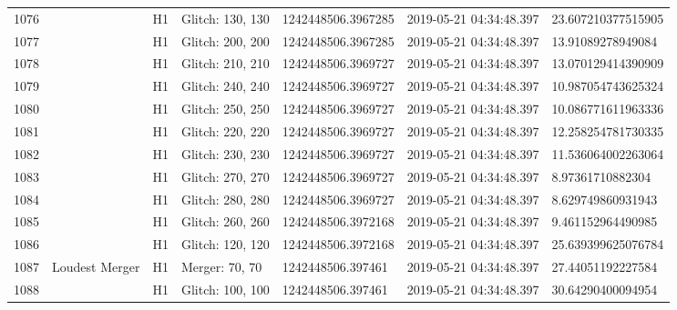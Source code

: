 \begin{longtable}{lllllll}
1076 &                                                    &       H1 &  Glitch: 130, 130 &  1242448506.3967285 &  2019-05-21 04:34:48.397 &  23.607210377515905 \\
1077 &                                                    &       H1 &  Glitch: 200, 200 &  1242448506.3967285 &  2019-05-21 04:34:48.397 &   13.91089278949084 \\
1078 &                                                    &       H1 &  Glitch: 210, 210 &  1242448506.3969727 &  2019-05-21 04:34:48.397 &  13.070129414390909 \\
1079 &                                                    &       H1 &  Glitch: 240, 240 &  1242448506.3969727 &  2019-05-21 04:34:48.397 &  10.987054743625324 \\
1080 &                                                    &       H1 &  Glitch: 250, 250 &  1242448506.3969727 &  2019-05-21 04:34:48.397 &  10.086771611963336 \\
1081 &                                                    &       H1 &  Glitch: 220, 220 &  1242448506.3969727 &  2019-05-21 04:34:48.397 &  12.258254781730335 \\
1082 &                                                    &       H1 &  Glitch: 230, 230 &  1242448506.3969727 &  2019-05-21 04:34:48.397 &  11.536064002263064 \\
1083 &                                                    &       H1 &  Glitch: 270, 270 &  1242448506.3969727 &  2019-05-21 04:34:48.397 &    8.97361710882304 \\
1084 &                                                    &       H1 &  Glitch: 280, 280 &  1242448506.3969727 &  2019-05-21 04:34:48.397 &   8.629749860931943 \\
1085 &                                                    &       H1 &  Glitch: 260, 260 &  1242448506.3972168 &  2019-05-21 04:34:48.397 &   9.461152964490985 \\
1086 &                                                    &       H1 &  Glitch: 120, 120 &  1242448506.3972168 &  2019-05-21 04:34:48.397 &  25.639399625076784 \\
1087 &                                     Loudest Merger &       H1 &    Merger: 70, 70 &   1242448506.397461 &  2019-05-21 04:34:48.397 &   27.44051192227584 \\
1088 &                                                    &       H1 &  Glitch: 100, 100 &   1242448506.397461 &  2019-05-21 04:34:48.397 &   30.64290400094954 \\

\end{longtable}
